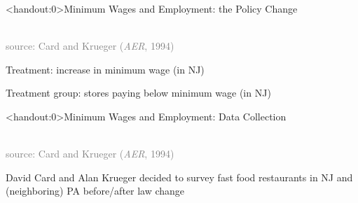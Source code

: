 \documentclass[10pt,xcolor=table,ignorenonframetext,handout,aspectratio=169]{beamer}
\begin{document}
\begin{frame}<handout:0>{Minimum Wages and Employment:  the Policy Change}

\begin{center}
	\\
	\textcolor{gray}{\tiny{source:  Card and Krueger (\emph{AER}, 1994)}}
\end{center}

\pause
\medskip
\structure{$\Rightarrow$} Treatment:  increase in minimum wage (in NJ)

\pause
\medskip
\structure{$\Rightarrow$} Treatment group:  stores paying below minimum wage (in NJ)


\end{frame}




\begin{frame}<handout:0>{Minimum Wages and Employment:  Data Collection}

\begin{center}
	\\
	\textcolor{gray}{\tiny{source:  Card and Krueger (\emph{AER}, 1994)}}
\end{center}

David Card and Alan Krueger decided to survey fast food restaurants in NJ and (neighboring) PA before/after law change


\end{frame}
\end{document}
